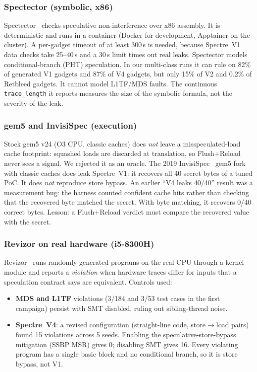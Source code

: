 \documentclass[conference]{IEEEtran}
\begin{document}
\subsubsection{Spectector (symbolic, x86)}
Spectector~\cite{spectector} checks speculative non-interference over x86
assembly. It is deterministic and runs in a container (Docker for development,
Apptainer on the cluster). A per-gadget timeout of at least 300\,s is needed,
because Spectre~V1 data checks take 25--40\,s and a 30\,s limit times out real
leaks. Spectector models conditional-branch (PHT) speculation. In our
multi-class runs it can rule on 82\% of generated V1 gadgets and 87\% of V4
gadgets, but only 15\% of V2 and 0.2\% of Retbleed gadgets. It cannot model
L1TF/MDS faults. The continuous \texttt{trace\_length} it reports measures the
size of the symbolic formula, not the severity of the leak.

\subsubsection{gem5 and InvisiSpec (execution)}
Stock gem5 v24 (O3 CPU, classic caches) does \emph{not} leave a
misspeculated-load cache footprint: squashed loads are discarded at
translation, so Flush+Reload never sees a signal. We rejected it as an
oracle. The 2019 InvisiSpec~\cite{invisispec} gem5 fork with classic caches
does leak Spectre~V1: it recovers all 40 secret bytes of a tuned PoC. It does
\emph{not} reproduce store bypass. An earlier ``V4 leaks 40/40'' result was a
measurement bug: the harness counted confident cache hits rather than checking
that the recovered byte matched the secret. With byte matching, it recovers
0/40 correct bytes. Lesson: a Flush+Reload verdict must compare the recovered
value with the secret.

\subsubsection{Revizor on real hardware (i5-8300H)}
Revizor~\cite{revizor} runs randomly generated programs on the real CPU through
a kernel module and reports a \emph{violation} when hardware traces differ for
inputs that a speculation contract says are equivalent. Controls used:
\begin{itemize}[itemsep=1pt,leftmargin=1.2em]
  \item \textbf{MDS and L1TF} violations (3/184 and 3/53 test cases in the
    first campaign) persist with SMT disabled, ruling out sibling-thread
    noise.
  \item \textbf{Spectre~V4}: a revised configuration (straight-line code,
    store$\to$load pairs) found 15 violations across 5 seeds. Enabling the
    speculative-store-bypass mitigation (SSBP MSR) gives 0; disabling SMT
    gives 16. Every violating program has a single basic block and no
    conditional branch, so it is store bypass, not V1.
\end{itemize}
\end{document}

